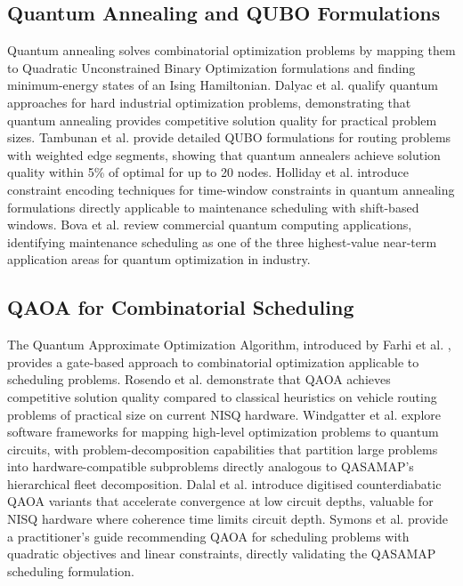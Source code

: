 \subsection{Quantum Annealing and QUBO Formulations}

Quantum annealing solves combinatorial optimization problems by mapping them to Quadratic Unconstrained Binary Optimization formulations and finding minimum-energy states of an Ising Hamiltonian. Dalyac et al. \cite{dalyac_qualifying_2021} qualify quantum approaches for hard industrial optimization problems, demonstrating that quantum annealing provides competitive solution quality for practical problem sizes. Tambunan et al. \cite{Tambunan2022} provide detailed QUBO formulations for routing problems with weighted edge segments, showing that quantum annealers achieve solution quality within 5\% of optimal for up to 20 nodes. Holliday et al. \cite{holliday_advanced_2025} introduce constraint encoding techniques for time-window constraints in quantum annealing formulations directly applicable to maintenance scheduling with shift-based windows. Bova et al. \cite{Bova2021} review commercial quantum computing applications, identifying maintenance scheduling as one of the three highest-value near-term application areas for quantum optimization in industry.

\subsection{QAOA for Combinatorial Scheduling}

The Quantum Approximate Optimization Algorithm, introduced by Farhi et al. \cite{Farhi2014}, provides a gate-based approach to combinatorial optimization applicable to scheduling problems. Rosendo et al. \cite{rosendo_quantum_2025} demonstrate that QAOA achieves competitive solution quality compared to classical heuristics on vehicle routing problems of practical size on current NISQ hardware. Windgatter et al. \cite{windgatter_quantum_2025} explore software frameworks for mapping high-level optimization problems to quantum circuits, with problem-decomposition capabilities that partition large problems into hardware-compatible subproblems directly analogous to QASAMAP's hierarchical fleet decomposition. Dalal et al. \cite{dalal_digitized_2024} introduce digitised counterdiabatic QAOA variants that accelerate convergence at low circuit depths, valuable for NISQ hardware where coherence time limits circuit depth. Symons et al. \cite{symons_practitioners_2023} provide a practitioner's guide recommending QAOA for scheduling problems with quadratic objectives and linear constraints, directly validating the QASAMAP scheduling formulation.

